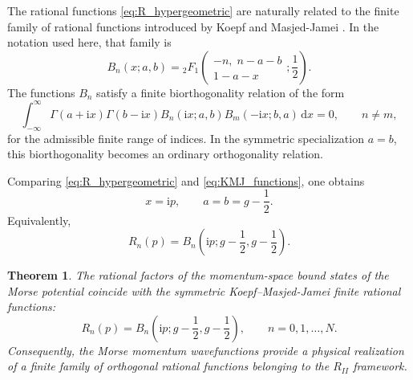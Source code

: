 \documentclass[11pt,reqno]{amsart}
\newcommand{\ii}{\mathrm{i}}
\newcommand{\dd}{\mathrm{d}}
\numberwithin{equation}{section}
\newtheorem{theorem}{Theorem}[section]
\begin{document}
The rational functions \eqref{eq:R_hypergeometric} are naturally related to the finite family of
rational functions introduced by Koepf and Masjed-Jamei \cite{KoepfMasjedJamei2007}.  In the
notation used here, that family is
\begin{equation}
  B_n(x;a,b)=
  {}_2F_1\!\left(
  \begin{matrix}
  -n,\; n-a-b\\
  1-a-x
  \end{matrix};\frac12
  \right).
  \label{eq:KMJ_functions}
\end{equation}
The functions $B_n$ satisfy a finite biorthogonality relation of the form
\begin{equation}
  \int_{-\infty}^{\infty}
  \Gamma(a+\ii x)\Gamma(b-\ii x)
  B_n(\ii x;a,b)B_m(-\ii x;b,a)\,\dd x=0,
  \qquad n\ne m,
  \label{eq:KMJ_biorthogonality}
\end{equation}
for the admissible finite range of indices.  In the symmetric specialization $a=b$, this
biorthogonality becomes an ordinary orthogonality relation.

Comparing \eqref{eq:R_hypergeometric} and \eqref{eq:KMJ_functions}, one obtains
\begin{equation}
  x=\ii p,
  \qquad a=b=g-\frac12.
  \label{eq:parameter_identification}
\end{equation}
Equivalently,
\begin{equation}
  R_n(p)=B_n\!\left(\ii p;g-\frac12,g-\frac12\right).
  \label{eq:R_B_identification}
\end{equation}

\begin{theorem}\label{thm:main_identification}
The rational factors of the momentum-space bound states of the Morse potential coincide with the
symmetric Koepf--Masjed-Jamei finite rational functions:
\begin{equation}
  R_n(p)=B_n\!\left(\ii p;g-\frac12,g-\frac12\right),
  \qquad n=0,1,\dots,N.
\end{equation}
Consequently, the Morse momentum wavefunctions provide a physical realization of a finite family
of orthogonal rational functions belonging to the $R_{II}$ framework.
\end{theorem}
\end{document}
